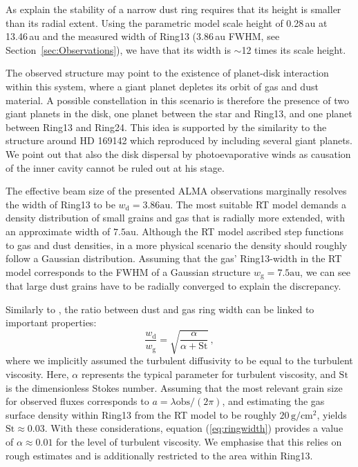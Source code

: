 \documentclass[letters,usenatbib,times]{mnras}
\begin{document}
As \citet{2018ApJ...869L..46D} explain the stability of a narrow dust ring requires that its height is smaller than its radial extent. Using the parametric model scale height of 0.28\,au at 13.46\,au and the measured width of Ring13 (3.86\,au FWHM, see Section~\ref{sec:Observations}), we have that its width is $\sim$12 times its scale height.

The observed structure may point to the existence of planet-disk interaction within this system, where a giant planet depletes its orbit of gas and dust material. A possible constellation in this scenario is therefore the presence of two giant planets in the disk, one planet between the star and Ring13, and one planet between Ring13 and Ring24. This idea is supported by the similarity to the structure around HD 169142 which \citet{bertrang_avenhaus_2018} reproduced by including several giant planets. We point out that also the disk dispersal by photoevaporative winds \citep{1994ApJ...428..654H} as causation of the inner cavity cannot be ruled out at his stage.

The effective beam size of the presented ALMA observations marginally resolves the width of Ring13 to be $w_\mathrm{d} = 3.86\mathrm{au}$. The most suitable RT model demands a density distribution of small grains and gas that is radially more extended, with an approximate width of $7.5\mathrm{au}$. Although the RT model ascribed step functions to gas and dust densities, in a more physical scenario the density should roughly follow a Gaussian distribution. Assuming that the gas' Ring13-width in the RT model corresponds to the FWHM of a Gaussian structure $w_\mathrm{g} = 7.5\mathrm{au}$, we can see that large dust grains have to be radially converged to explain the discrepancy.

Similarly to \citet{2018ApJ...869L..46D}, the ratio between dust and gas ring width can be linked to important properties:
\begin{equation}\label{eq:ringwidth}
        \frac{w_\mathrm{d}}{w_\mathrm{g}} = \sqrt{\frac{\alpha}{\alpha+\mathrm{St}}}\,,
\end{equation}
where we implicitly assumed the turbulent diffusivity to be equal to the turbulent viscosity. Here, $\alpha$ represents the typical parameter for turbulent viscosity, and $\mathrm{St}$ is the dimensionless Stokes number. Assuming that the most relevant grain size for observed fluxes corresponds to $a = \lambda \mathrm{obs}/(2 \pi)$, and estimating the gas surface density within Ring13 from the RT model to be roughly $20\,\mathrm{g}/\mathrm{cm}^2$, yields $\mathrm{St}\approx 0.03$. With these considerations, equation (\ref{eq:ringwidth}) provides a value of $\alpha \approx 0.01$ for the level of turbulent viscosity. We emphasise that this relies on rough estimates and is additionally restricted to the area within Ring13.
\end{document}
